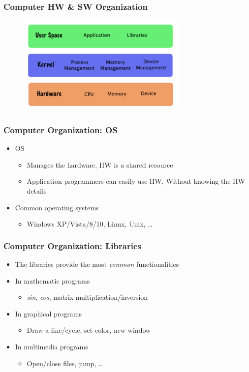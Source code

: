 \documentclass{../c-lecture}
\begin{document}
\begin{frame}
  \frametitle{Computer HW \& SW Organization}
  \begin{figure}
    \includegraphics[width=0.75\textwidth]{./img/sw-and-hw.png}
  \end{figure}
\end{frame}

\begin{frame}
  \frametitle{Computer Organization: OS}
  \begin{itemize}
    \item OS
    \begin{itemize}
      \item
        Manages the hardware, HW is a
        {\color{Orange} shared} resource
      \item
        Application programmers can easily use HW, Without knowing the HW
        details
    \end{itemize}
    \item Common operating systems
    \begin{itemize}
      \item Windows XP/Vista/8/10, Linux, Unix, \ldots
    \end{itemize}
  \end{itemize}
\end{frame}

\begin{frame}
  \frametitle{Computer Organization: Libraries}
  \begin{itemize}
    \item The libraries provide the most
      \textit{\color{Green} common} functionalities
    \item In mathematic programs
    \begin{itemize}
      \item \textit{sin}, \textit{cos}, matrix multiplication/inversion
    \end{itemize}
    \item In graphical programs
    \begin{itemize}
      \item Draw a line/cycle, set color, new window
    \end{itemize}
    \item In multimedia programs
    \begin{itemize}
      \item Open/close files, jump, \ldots
    \end{itemize}
  \end{itemize}
\end{frame}
\end{document}
